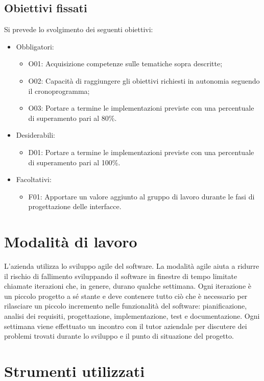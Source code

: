 \subsection{Obiettivi fissati}
Si prevede lo svolgimento dei seguenti obiettivi:
\begin{itemize}
    \item Obbligatori:
    \begin{itemize}
        \item O01: Acquisizione competenze sulle tematiche sopra descritte;
        \item O02: Capacità di raggiungere gli obiettivi richiesti in autonomia seguendo il cronoprogramma;
        \item O03: Portare a termine le implementazioni previste con una percentuale di superamento pari al 80\%.        
    \end{itemize}
    \item Desiderabili:
     \begin{itemize}
        \item D01: Portare a termine le implementazioni previste con una percentuale di superamento pari al 100\%.
     \end{itemize}
     \item Facoltativi:
     \begin{itemize}
        \item F01: Apportare un valore aggiunto al gruppo di lavoro durante le fasi di progettazione delle interfacce.
     \end{itemize}
\end{itemize}


\section{Modalità di lavoro}
L'azienda utilizza lo sviluppo agile del software. La modalità agile aiuta a ridurre il rischio di fallimento sviluppando il software in finestre di tempo limitate chiamate iterazioni che, in genere, durano qualche settimana. Ogni iterazione è un piccolo progetto a sé stante e deve contenere tutto ciò che è necessario per rilasciare un piccolo incremento nelle funzionalità del software: pianificazione, analisi dei requisiti, progettazione, implementazione, test e documentazione. Ogni settimana viene effettuato un incontro con il tutor aziendale per discutere dei problemi trovati durante lo sviluppo e il punto di situazione del progetto.

\section{Strumenti utilizzati}
